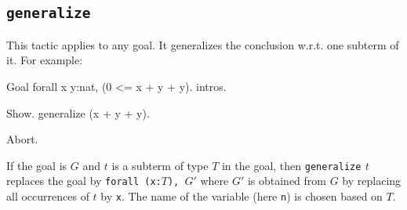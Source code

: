 \begin{coq_example*}
\begin{Variants}

\end{Variants}

\subsection{\tt generalize \term}
\label{generalize}

This tactic applies to any goal. It generalizes the conclusion w.r.t.
one subterm of it. For example:

\begin{coq_eval}
Goal forall x y:nat, (0 <= x + y + y).
intros.
\end{coq_eval}
\begin{coq_example}
Show.
generalize (x + y + y).
\end{coq_example}

\begin{coq_eval}
Abort.
\end{coq_eval}

If the goal is $G$ and $t$ is a subterm of type $T$ in the goal, then
{\tt generalize} \textit{t} replaces the goal by {\tt forall (x:$T$), $G'$}
where $G'$ is obtained from $G$ by replacing all occurrences of $t$ by
{\tt x}. The name of the variable (here {\tt n}) is chosen based on $T$.

\end{coq_example*}
